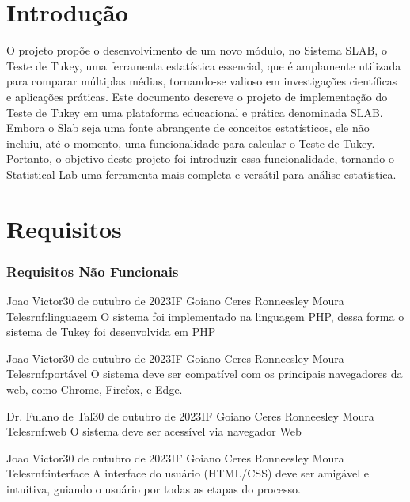 \chapter{Introdução}
\label{capitulo:introducao}

O projeto propõe o desenvolvimento de um novo módulo, no Sistema SLAB, o Teste de Tukey, uma ferramenta estatística essencial, que é amplamente utilizada para comparar múltiplas médias, tornando-se valioso em investigações científicas e aplicações práticas. Este documento descreve o projeto de implementação do Teste de Tukey em uma plataforma educacional e prática denominada SLAB. Embora o Slab seja uma fonte abrangente de conceitos estatísticos, ele não incluiu, até o momento, uma funcionalidade para calcular o Teste de Tukey. Portanto, o objetivo deste projeto foi introduzir essa funcionalidade, tornando o Statistical Lab uma ferramenta mais completa e versátil para análise estatística.

\chapter{Requisitos}

\subsection{Requisitos Não Funcionais}

{Joao Victor}{30 de outubro de 2023}{IF Goiano Ceres}
{Ronneesley Moura Teles}{rnf:linguagem}
{O sistema foi implementado na linguagem PHP, dessa forma o sistema de Tukey foi desenvolvida em PHP}

{Joao Victor}{30 de outubro de 2023}{IF Goiano Ceres}
{Ronneesley Moura Teles}{rnf:portável}
{O sistema deve ser compatível com os principais navegadores da web, como Chrome, Firefox, e Edge.}

{Dr. Fulano de Tal}{30 de outubro de 2023}{IF Goiano Ceres}
{Ronneesley Moura Teles}{rnf:web}
{O sistema deve ser acessível via navegador Web}

{Joao Victor}{30 de outubro de 2023}{IF Goiano Ceres}
{Ronneesley Moura Teles}{rnf:interface}
{A interface do usuário (HTML/CSS) deve ser amigável e intuitiva, guiando o usuário por todas as etapas do processo.}

